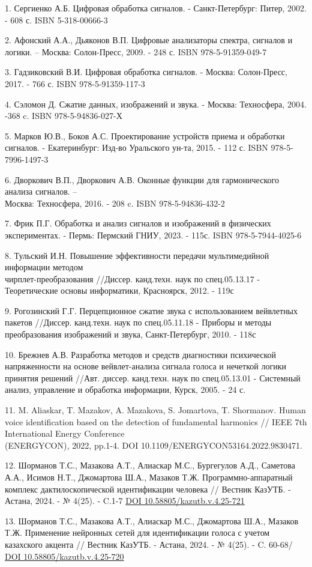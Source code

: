 \begin{references}
1. Сергиенко А.Б. Цифровая обработка сигналов. - Санкт-Петербург: Питер,
2002. - 608 с. ISBN 5-318-00666-3

2. Афонский А.А., Дьяконов В.П. Цифровые анализаторы спектра, сигналов и
логики. -- Москва: Солон-Пресс, 2009. - 248 с. ISBN 978-5-91359-049-7

3. Гадзиковский В.И. Цифровая обработка сигналов. - Москва: Солон-Пресс,
2017. - 766 с. ISBN 978-5-91359-117-3

4. Сэломон Д. Сжатие данных, изображений и звука. - Москва: Техносфера,
2004. -368 c. ISBN 978-5-94836-027-Х

5. Марков Ю.В., Боков А.С. Проектирование устройств приема и обработки
сигналов. - Екатеринбург: Изд-во Уральского ун-та, 2015. - 112 с. ISBN
978-5-7996-1497-3

6. Дворкович В.П., Дворкович А.В. Оконные функции для гармонического
анализа сигналов. -- \\Москва: Техносфера, 2016. - 208 c. ISBN
978-5-94836-432-2

7. Фрик П.Г. Обработка и анализ сигналов и изображений в физических
экспериментах. - Пермь: Пермский ГНИУ, 2023. - 115с. ISBN
978-5-7944-4025-6

8. Тульский И.Н. Повышение эффективности передачи мультимедийной
информации методом \\чирплет-преобразования //Диссер. канд.техн. наук по
спец.05.13.17 - Теоретические основы информатики, Красноярск, 2012. -
119с

9. Рогозинский Г.Г. Перцепционное сжатие звука с использованием
вейвлетных пакетов //Диссер. канд.техн. наук по спец.05.11.18 - Приборы
и методы преобразования изображений и звука, Санкт-Петербург, 2010. -
118с

10. Брежнев А.В. Разработка методов и средств диагностики психической
напряженности на основе вейвлет-анализа сигнала голоса и нечеткой логики
принятия решений //Авт. диссер. канд.техн. наук по спец.05.13.01 -
Системный анализ, управление и обработка информации, Курск, 2005. - 24
с.

11. M. Aliaskar, T. Mazakov, A. Mazakova, S. Jomartova, T. Shormanov.
Human voice identification based on the detection of fundamental
harmonics // IEEE 7th International Energy Conference\\
(ENERGYCON)\emph{,} 2022, pp.1-4. DOI
10.1109/ENERGYCON53164.2022.9830471.

12. Шорманов Т.С., Мазакова А.Т., Алиаскар М.С., Бургегулов А.Д.,
Саметова А.А., Исимов Н.Т., Джомартова Ш.А., Мазаков Т.Ж.
Программно-аппаратный комплекс дактилоскопической идентификации человека
// Вестник КазУТБ. - Астана, 2024. - № 4(25). - C.1-7
\href{https://doi.org/10.58805/kazutb.v.4.25-721}{DOI
10.58805/kazutb.v.4.25-721}

13. Шорманов Т.С., Мазакова А.Т., Алиаскар М.С., Джомартова Ш.А., Мазаков
Т.Ж. Применение нейронных сетей для идентификации голоса с учетом
казахского акцента // Вестник КазУТБ. - Астана, 2024. - № 4(25). - C.
60-68/
\href{https://doi.org/10.58805/kazutb.v.4.25-720}{DOI 10.58805/kazutb.v.4.25-720}
\end{references}

